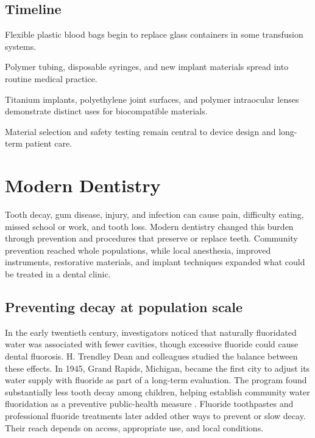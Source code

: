 \documentclass[12pt,oneside]{book}
\begin{document}
\section*{Timeline}
\begin{description}[leftmargin=2.3cm,style=nextline]
  \item[1940s] Flexible plastic blood bags begin to replace glass containers in some transfusion systems.
  \item[1950s--1960s] Polymer tubing, disposable syringes, and new implant materials spread into routine medical practice.
  \item[1960s onward] Titanium implants, polyethylene joint surfaces, and polymer intraocular lenses demonstrate distinct uses for biocompatible materials.
  \item[Today] Material selection and safety testing remain central to device design and long-term patient care.
\end{description}

\chapter[Modern Dentistry]{Modern Dentistry}

Tooth decay, gum disease, injury, and infection can cause pain, difficulty
eating, missed school or work, and tooth loss. Modern dentistry changed this
burden through prevention and procedures that preserve or replace teeth.
Community prevention reached whole populations, while local anesthesia,
improved instruments, restorative materials, and implant techniques expanded
what could be treated in a dental clinic.

\section{Preventing decay at population scale}
In the early twentieth century, investigators noticed that naturally
fluoridated water was associated with fewer cavities, though excessive
fluoride could cause dental fluorosis. H. Trendley Dean and colleagues
studied the balance between these effects. In 1945, Grand Rapids, Michigan,
became the first city to adjust its water supply with fluoride as part of a
long-term evaluation. The program found substantially less tooth decay among
children, helping establish community water fluoridation as a preventive
public-health measure \cite{nidcrFluoridationHistory,nidcrFluoridation}.
Fluoride toothpastes and professional fluoride treatments later added other
ways to prevent or slow decay. Their reach depends on access, appropriate
use, and local conditions.
\end{document}
